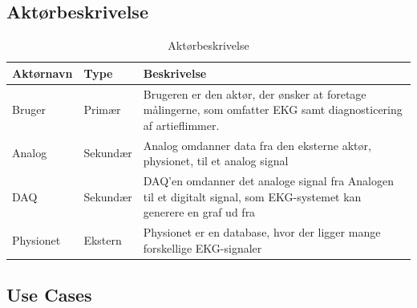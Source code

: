 \subsection{Aktørbeskrivelse}

\begin{table}[H]
\begin{tabularx}{\textwidth}{l l X}
     Aktørnavn  & Type      & Beskrivelse \\ \midrule
     Bruger   & Primær    & Brugeren er den aktør, der ønsker at foretage målingerne, som omfatter EKG samt diagnosticering af artieflimmer.\\ 						  									  \addlinespace[2mm]
     Analog & Sekundær  & Analog omdanner data fra den eksterne aktør, physionet, til et analog signal \\ 
     	\addlinespace[2mm]
     DAQ & Sekundær  & DAQ'en omdanner det analoge signal fra Analogen til et digitalt signal, som EKG-systemet kan generere en graf ud fra  \\ 
     	\addlinespace[2mm]
     Physionet & Ekstern 	& Physionet er en database, hvor der ligger mange forskellige EKG-signaler  \\	                                                                                                                                                                           
   
     \bottomrule                                                                                                                   
    \end{tabularx}
    \caption {Aktørbeskrivelse}
    \label{tab:aktoerbeskrivelse}
	
\end{table}

\subsection{Use Cases}

